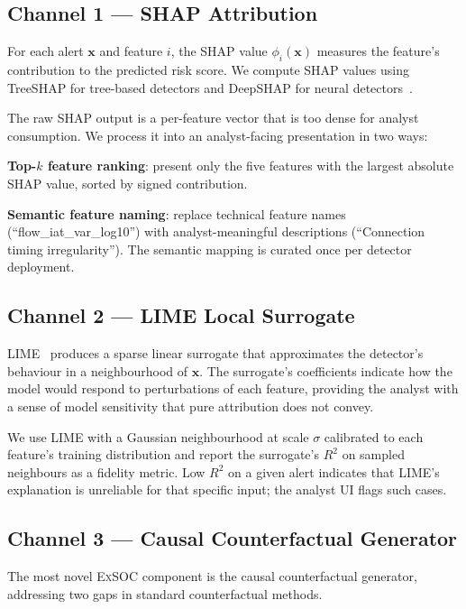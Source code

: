 \documentclass[sigconf,nonacm]{acmart}
\begin{document}
\subsection{Channel 1 --- SHAP Attribution}

For each alert $\mathbf{x}$ and feature $i$, the SHAP value
$\phi_i(\mathbf{x})$ measures the feature's contribution to the predicted
risk score. We compute SHAP values using TreeSHAP for tree-based detectors
and DeepSHAP for neural detectors~\cite{lundberg2020}.

The raw SHAP output is a per-feature vector that is too dense for analyst
consumption. We process it into an analyst-facing presentation in two ways:

\textbf{Top-$k$ feature ranking}: present only the five features with the
largest absolute SHAP value, sorted by signed contribution.

\textbf{Semantic feature naming}: replace technical feature names
(``flow\_iat\_var\_log10'') with analyst-meaningful descriptions
(``Connection timing irregularity''). The semantic mapping is curated
once per detector deployment.

\subsection{Channel 2 --- LIME Local Surrogate}

LIME~\cite{ribeiro2016lime} produces a sparse linear surrogate that
approximates the detector's behaviour in a neighbourhood of $\mathbf{x}$.
The surrogate's coefficients indicate how the model would respond to
perturbations of each feature, providing the analyst with a sense of model
sensitivity that pure attribution does not convey.

We use LIME with a Gaussian neighbourhood at scale $\sigma$ calibrated to
each feature's training distribution and report the surrogate's $R^2$ on
sampled neighbours as a fidelity metric. Low $R^2$ on a given alert
indicates that LIME's explanation is unreliable for that specific input;
the analyst UI flags such cases.

\subsection{Channel 3 --- Causal Counterfactual Generator}

The most novel \textsc{ExSOC} component is the causal counterfactual
generator, addressing two gaps in standard counterfactual methods.
\end{document}
